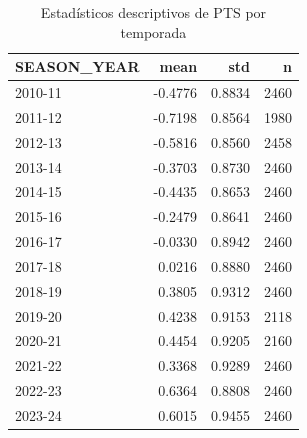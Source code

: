 \begin{table}[H]
\centering
\caption{Estadísticos descriptivos de PTS por temporada}
\label{tab:anova-desc-pts}
\begin{tabular}{lrrr}
\toprule
SEASON\_YEAR & mean & std & n \\
\midrule
2010-11 & -0.4776 & 0.8834 & 2460 \\
2011-12 & -0.7198 & 0.8564 & 1980 \\
2012-13 & -0.5816 & 0.8560 & 2458 \\
2013-14 & -0.3703 & 0.8730 & 2460 \\
2014-15 & -0.4435 & 0.8653 & 2460 \\
2015-16 & -0.2479 & 0.8641 & 2460 \\
2016-17 & -0.0330 & 0.8942 & 2460 \\
2017-18 & 0.0216 & 0.8880 & 2460 \\
2018-19 & 0.3805 & 0.9312 & 2460 \\
2019-20 & 0.4238 & 0.9153 & 2118 \\
2020-21 & 0.4454 & 0.9205 & 2160 \\
2021-22 & 0.3368 & 0.9289 & 2460 \\
2022-23 & 0.6364 & 0.8808 & 2460 \\
2023-24 & 0.6015 & 0.9455 & 2460 \\
\bottomrule
\end{tabular}
\end{table}
